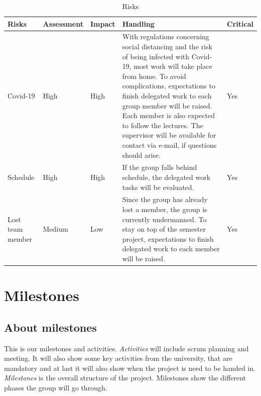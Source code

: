 \begin{table}[ht]
    \begin{tabularx}{\textwidth}{|>{\RaggedRight}p{1.7cm}|>{\RaggedRight}p{2.2cm}|>{\RaggedRight}p{1.4cm}|>{\RaggedRight}X|>{\RaggedRight}p{1.6cm}|}
        \hline
        \textbf{Risks} & \textbf{Assessment} & \textbf{Impact} & \textbf{Handling} & \textbf{Critical} \\
        \hline
        Covid-19 & High & High & 
        With regulations concerning social distancing and the risk of being infected
        with Covid-19, most work will take place from home. To avoid complications,
        expectations to finish delegated work to each group member will be raised. Each
        member is also expected to follow the lectures. The supervisor will be available
        for contact via e-mail, if questions should arise.
                 & Yes \\
                 \hline
        Schedule & High & High &
        If the group falls behind schedule, the delegated work tasks will be evaluated.
                 & Yes \\
                 \hline
        Lost team member        & Medium & Low & 
        Since the group has already lost a member, the group is currently undermanned.
        To stay on top of the semester project, expectations to finish delegated work to
        each member will be raised.
                                & Yes \\
                                \hline
    \end{tabularx}
    \caption{Risks} 
    \label{table:Risks}
\end{table} 


\section{Milestones}

\subsection{About milestones}
This is our milestones and activities.
\textit{Activities} will include scrum planning and meeting.
It will also show some key activities from the university, that are mandatory
and at last it will also show when the project is need to be handed in.
\textit{Milestones} is the overall structure of the project.
Milestones show the different phases the group will go through.

